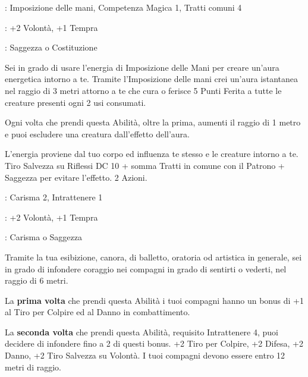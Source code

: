 \begin{multicols}{2}
\begin{description}[noitemsep, topsep=0pt, parsep=0pt, partopsep=0pt, leftmargin=0cm, labelwidth=2.5cm]
    \item[\textbf{Requisito}]: Imposizione delle mani, Competenza Magica 1, Tratti comuni 4
    \item[\textbf{Tiri Salvezza}]: +2 Volontà, +1 Tempra
    \item[\textbf{Caratteristica}]: Saggezza o Costituzione
\end{description}

Sei in grado di usare l'energia di Imposizione delle Mani per creare un'aura energetica intorno a te.
Tramite l'Imposizione delle mani crei un'aura istantanea nel raggio di 3 metri attorno a te che cura o ferisce 5 Punti Ferita a tutte le creature presenti ogni 2 usi consumati.

Ogni volta che prendi questa Abilità, oltre la prima, aumenti il raggio di 1 metro e puoi escludere una creatura dall'effetto dell'aura.

L'energia proviene dal tuo corpo ed influenza te stesso e le creature intorno a te. Tiro Salvezza su Riflessi DC 10 + somma Tratti in comune con il Patrono + Saggezza per evitare l'effetto.  2 Azioni.

%

\begin{description}[noitemsep, topsep=0pt, parsep=0pt, partopsep=0pt, leftmargin=0cm, labelwidth=2.5cm]
    \item[\textbf{Requisito}]: Carisma 2, Intrattenere 1
    \item[\textbf{Tiri Salvezza}]: +2 Volontà, +1 Tempra
    \item[\textbf{Caratteristica}]: Carisma o Saggezza
\end{description}

Tramite la tua esibizione, canora, di balletto, oratoria od artistica in generale, sei in grado di infondere coraggio nei compagni in grado di sentirti o vederti, nel raggio di 6 metri.

La \textbf{prima volta} che prendi questa Abilità i tuoi compagni hanno un bonus di +1 al Tiro per Colpire ed al Danno in combattimento.

La \textbf{seconda volta} che prendi questa Abilità, requisito Intrattenere 4, puoi decidere di infondere fino a 2 di questi bonus. +2 Tiro per Colpire, +2 Difesa, +2 Danno, +2 Tiro Salvezza su Volontà. I tuoi compagni devono essere entro 12 metri di raggio.


\end{multicols}
